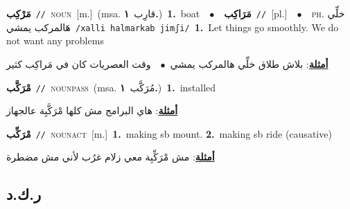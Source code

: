 \documentclass[10pt,a4paper,twoside]{article} %
\begin{document}
\begin{multicols}{2}
{\setlength\topsep{0pt}\textbf{\foreignlanguage{arabic}{مَرْكِب}}\ {\color{gray}\texttt{//}\color{black}}\ \textsc{noun}\ [m.]\ \color{gray}(msa. \foreignlanguage{arabic}{قارِب}~\foreignlanguage{arabic}{\textbf{١.}})\color{black}\ \textbf{1.}~boat\ \ $\bullet$\ \ \setlength\topsep{0pt}\textbf{\foreignlanguage{arabic}{مَرَاكِب}}\ {\color{gray}\texttt{//}\color{black}}\ [pl.]\ \ $\bullet$\ \ \textsc{ph.} \color{gray} \foreignlanguage{arabic}{خلِّي هَالمركب يمشي}\color{black}\ {\color{gray}\texttt{/{\sffamily xalli halmarkab jimʃi}/}\color{black}}\ \textbf{1.}~Let things go smoothly. We do not want any problems\  \begin{flushright}\color{gray}\foreignlanguage{arabic}{\textbf{\underline{\foreignlanguage{arabic}{أمثلة}}}: بلاش طلاق خلِّي هالمركب يمشي\ $\bullet$\ \  وقت العصريات كان في مَراكِب كثير}\end{flushright}\color{black}} \vspace{2mm}

{\setlength\topsep{0pt}\textbf{\foreignlanguage{arabic}{مْرَكَّب}}\ {\color{gray}\texttt{//}\color{black}}\ \textsc{noun\textunderscore pass}\ \color{gray}(msa. \foreignlanguage{arabic}{مُرَكَّب}~\foreignlanguage{arabic}{\textbf{١.}})\color{black}\ \textbf{1.}~installed\  \begin{flushright}\color{gray}\foreignlanguage{arabic}{\textbf{\underline{\foreignlanguage{arabic}{أمثلة}}}: هاي البرامج مش كلها مْرَكَّبِة عالجهاز}\end{flushright}\color{black}} \vspace{2mm}

{\setlength\topsep{0pt}\textbf{\foreignlanguage{arabic}{مْرَكِّب}}\ {\color{gray}\texttt{//}\color{black}}\ \textsc{noun\textunderscore act}\ [m.]\ \textbf{1.}~making sb mount.  \textbf{2.}~making sb ride (causative)\  \begin{flushright}\color{gray}\foreignlanguage{arabic}{\textbf{\underline{\foreignlanguage{arabic}{أمثلة}}}: مش مْرَكِّبِة معي زلام غرُب لأني مش مضطرة}\end{flushright}\color{black}} \vspace{2mm}

\vspace{-3mm}
\subsection*{\color{blue}\foreignlanguage{arabic}{ر.ك.د}\color{blue}{}} 


\end{multicols}
\end{document}
